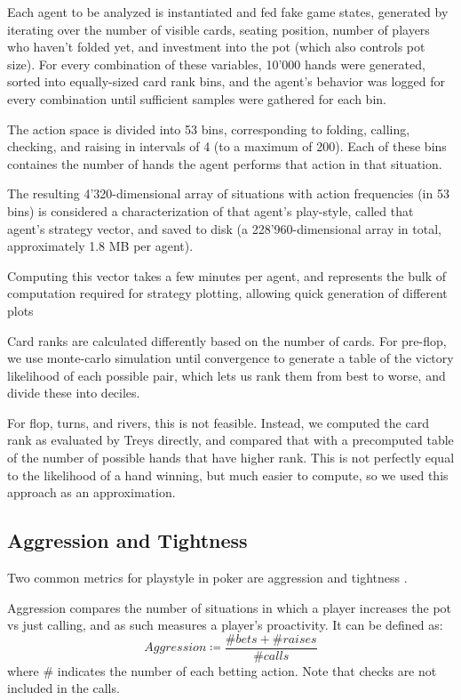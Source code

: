 Each agent to be analyzed is instantiated and fed fake game states, generated by iterating over the number of visible cards, seating position, number of players who haven't folded yet, and investment into the pot (which also controls pot size). For every combination of these variables, 10'000 hands were generated, sorted into equally-sized card rank bins, and the agent's behavior was logged for every combination until sufficient samples were gathered for each bin.

The action space is divided into 53 bins, corresponding to folding, calling, checking, and raising in intervals of 4 (to a maximum of 200). Each of these bins containes the number of hands the agent performs that action in that situation.

The resulting 4'320-dimensional array of situations with action frequencies (in 53 bins) is considered a characterization of that agent's play-style, called that agent's strategy vector, and saved to disk (a 228'960-dimensional array in total, approximately 1.8 MB per agent).

Computing this vector takes a few minutes per agent, and represents the bulk of computation required for strategy plotting, allowing quick generation of different plots

Card ranks are calculated differently based on the number of cards. For pre-flop, we use monte-carlo simulation until convergence to generate a table of the victory likelihood of each possible pair, which lets us rank them from best to worse, and divide these into deciles.

For flop, turns, and rivers, this is not feasible. Instead, we computed the card rank as evaluated by Treys \cite{Treys} directly, and compared that with a precomputed table of the number of possible hands that have higher rank. This is not perfectly equal to the likelihood of a hand winning, but much easier to compute, so we used this approach as an approximation.

\subsection{Aggression and Tightness}

Two common metrics for playstyle in poker are aggression and tightness \cite{PokerStrategy}.

Aggression compares the number of situations in which a player increases the pot vs just calling, and as such measures a player's proactivity. It can be defined as:
\begin{equation}
    Aggression \coloneqq \frac{\# bets + \# raises}{\# calls}
\end{equation} where \# indicates the number of each betting action. Note that checks are not included in the calls.

